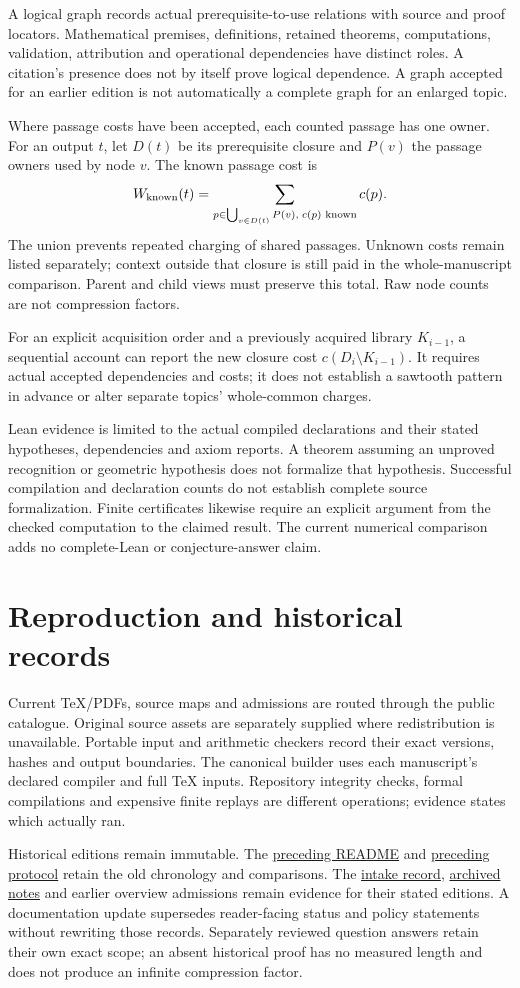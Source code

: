 \documentclass[11pt,a4paper]{article}
\begin{document}
A logical graph records actual prerequisite-to-use relations with source and
proof locators. Mathematical premises, definitions, retained theorems,
computations, validation, attribution and operational dependencies have distinct
roles. A citation's presence does not by itself prove logical dependence.
A graph accepted for an earlier edition is not automatically a complete graph
for an enlarged topic.

Where passage costs have been accepted, each counted passage has one owner.
For an output $t$, let $D(t)$ be its prerequisite closure and $P(v)$ the passage
owners used by node $v$. The known passage cost is
\[
 W_{\rm known}(t)=
 \sum_{p\in\bigcup_{v\in D(t)}P(v),\;c(p)\text{ known}}c(p).
\]
The union prevents repeated charging of shared passages. Unknown costs remain
listed separately; context outside that closure is still paid in the
whole-manuscript comparison. Parent and child views must preserve this total.
Raw node counts are not compression factors.

For an explicit acquisition order and a previously acquired library $K_{i-1}$,
a sequential account can report the new closure cost
$c(D_i\setminus K_{i-1})$. It requires actual accepted dependencies and costs;
it does not establish a sawtooth pattern in advance or alter separate topics'
whole-common charges.

Lean evidence is limited to the actual compiled declarations and their stated
hypotheses, dependencies and axiom reports. A theorem assuming an unproved
recognition or geometric hypothesis does not formalize that hypothesis.
Successful compilation and declaration counts do not establish complete source
formalization. Finite certificates likewise require an explicit argument from
the checked computation to the claimed result. The current numerical comparison
adds no complete-Lean or conjecture-answer claim.

\section{Reproduction and historical records}

Current TeX/PDFs, source maps and admissions are routed through the public
catalogue. Original source assets are separately supplied where redistribution
is unavailable. Portable input and arithmetic checkers record their exact
versions, hashes and output boundaries. The canonical builder uses each
manuscript's declared compiler and full TeX inputs. Repository integrity checks,
formal compilations and expensive finite replays are different operations;
evidence states which actually ran.

Historical editions remain immutable. The
\href{documentation/v1/previous/README.rst}{preceding README} and
\href{documentation/v1/previous/protocol.pdf}{preceding protocol} retain the old
chronology and comparisons. The \href{intake.json}{intake record},
\href{archive\_markdown.json}{archived notes} and earlier overview admissions
remain evidence for their stated editions. A documentation update supersedes
reader-facing status and policy statements without rewriting those records.
Separately reviewed question answers retain their own exact scope; an absent
historical proof has no measured length and does not produce an infinite
compression factor.
\end{document}
